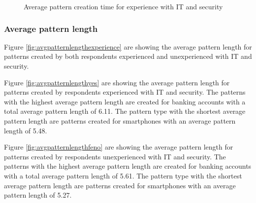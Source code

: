       \begin{figure}[H]
        \centering
        \caption{Average pattern creation time for experience with IT and security}
        \label{fig:avgcreationtimeexperience}
      \end{figure}

    \subsubsection{Average pattern length}

      Figure \ref{fig:avgpatternlengthexperience} are showing the average pattern length for patterns created by both respondents experienced and unexperienced with IT and security.

      Figure \ref{fig:avgpatternlengthyes} are showing the average pattern length for patterns created by respondents experienced with IT and security. The patterns with the highest average pattern length are created for banking accounts with a total average pattern length of 6.11. The pattern type with the shortest average pattern length are patterns created for smartphones with an average pattern length of 5.48.

      Figure \ref{fig:avgpatternlengthfeno} are showing the average pattern length for patterns created by respondents unexperienced with IT and security. The patterns with the highest average pattern length are created for banking accounts with a total average pattern length of 5.61. The pattern type with the shortest average pattern length are patterns created for smartphones with an average pattern length of 5.27. 

